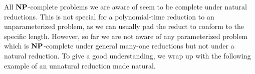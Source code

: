 \documentclass[11pt]{article}
\begin{document}

	
All $\mathbf{NP}$-complete problems we are aware of seem to be complete under natural reductions. This is not special for a polynomial-time reduction to an
unparameterized problem, as we can usually pad the reduct to conform to
the specific length. However, so far we are not aware of any parameterized
problem which is $\mathbf{NP}$-complete under general many-one reductions but not
under a natural reduction.
To give a good understanding, we wrap up with the following example of an
unnatural reduction made natural.
\end{document}
